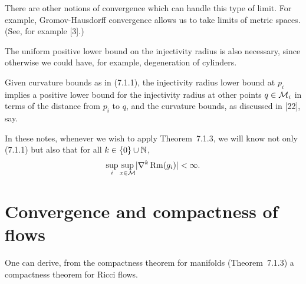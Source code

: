 There are other notions of convergence which can handle this type of limit. For
example, Gromov-Hausdorff convergence allows us to take limits of metric
spaces. (See, for example [3].)

\begin{remark}
\label{topping-ch7-injectivity-radius-needed}
The uniform positive lower bound on the injectivity radius is also necessary,
since otherwise we could have, for example, degeneration of cylinders.
\end{remark}

\begin{remark}
\label{topping-ch7-injectivity-radius-propagation}
Given curvature bounds as in (7.1.1), the injectivity radius lower bound at
$p_i$ implies a positive lower bound for the injectivity radius at other
points $q \in \mathcal{M}_i$ in terms of the distance from $p_i$ to $q$, and the
curvature bounds, as discussed in [22], say.
\end{remark}

\begin{remark}
\label{topping-ch7-compactness-usage}
In these notes, whenever we wish to apply Theorem~7.1.3, we will know not only
(7.1.1) but also that for all $k \in \{0\} \cup \mathbb{N}$,
\[
\sup_i \sup_{x \in \mathcal{M}} \lvert \nabla^k \operatorname{Rm}(g_i)\rvert < \infty.
\]
\end{remark}

\section{Convergence and compactness of flows}

One can derive, from the compactness theorem for manifolds (Theorem~7.1.3) a
compactness theorem for Ricci flows.

